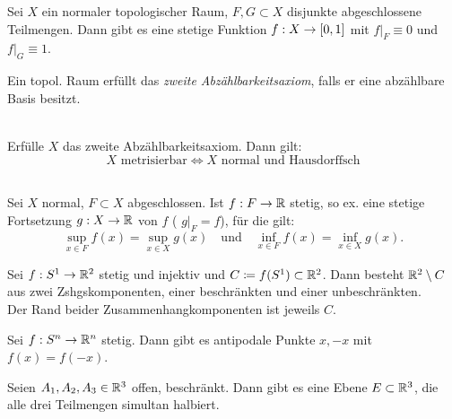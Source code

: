 \documentclass{cheat-sheet}
\begin{document}
\begin{lem}
  Sei $X$ ein normaler topologischer Raum, $F, G \subset X$ disjunkte abgeschlossene Teilmengen. Dann gibt es eine stetige Funktion $f : X \to \left[ 0, 1 \right]$ mit $f|_F \equiv 0$ und $f|_G \equiv 1$.
\end{lem}

\begin{defn}
  Ein topol. Raum erfüllt das \emph{zweite Abzählbarkeitsaxiom}, falls er eine abzählbare Basis besitzt.
\end{defn}

\begin{satz}\mbox{}\\
  Erfülle $X$ das zweite Abzählbarkeitsaxiom. Dann gilt:
  \[ \text{$X$ metrisierbar} \iff \text{$X$ normal und Hausdorffsch} \]
\end{satz}

\begin{satz}\mbox{}\\
  Sei $X$ normal, $F \subset X$ abgeschlossen. Ist $f : F \to \mathbb{R}$ stetig, so ex. eine stetige Fortsetzung $g : X \to \mathbb{R}$ von $f$ (\dh{} $g|_F = f$), für die gilt:
  \[
    \sup_{x \in F} f(x) = \sup_{x \in X} g(x)
    \quad \text{und} \quad
    \inf_{x \in F} f(x) = \inf_{x \in X} g(x).
  \]
\end{satz}



\begin{satz}
  Sei $f : S^1 \to \mathbb{R}^2$ stetig und injektiv und $C \coloneqq f(S^1) \subset \mathbb{R}^2$. Dann besteht $\mathbb{R}^2 \setminus C$ aus zwei Zshgskomponenten, einer beschränkten und einer unbeschränkten. \\
  Der Rand beider Zusammenhangkomponenten ist jeweils $C$.
\end{satz}


\begin{satz}
  Sei $f : S^n \to \mathbb{R}^n$ stetig. Dann gibt es antipodale Punkte $x, -x$ mit $f(x) = f(-x)$.
\end{satz}

\begin{satz}
  Seien $A_1, A_2, A_3 \in \mathbb{R}^3$ offen, beschränkt. Dann gibt es eine Ebene $E \subset \mathbb{R}^3$, die alle drei Teilmengen simultan halbiert.
\end{satz}
\end{document}
